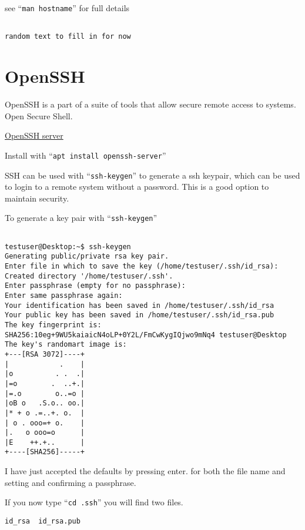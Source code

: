 \documentclass{book}
\begin{document}
see ``\verb|man hostname|'' for full details

\begin{verbatim}

random text to fill in for now

\end{verbatim}



\section{OpenSSH}

OpenSSH is a part of a suite of tools that allow secure remote access to systems. Open Secure Shell.

\href{https://www.openssh.com/}{OpenSSH server}

Install with ``\verb|apt install openssh-server|''

SSH can be used with ``\verb|ssh-keygen|'' to generate a ssh keypair, which can be used to login to a remote system without a password. This is a good option to maintain security.

To generate a key pair with ``\verb|ssh-keygen|''


\begin{verbatim}

testuser@Desktop:~$ ssh-keygen
Generating public/private rsa key pair.
Enter file in which to save the key (/home/testuser/.ssh/id_rsa):
Created directory '/home/testuser/.ssh'.
Enter passphrase (empty for no passphrase):
Enter same passphrase again:
Your identification has been saved in /home/testuser/.ssh/id_rsa
Your public key has been saved in /home/testuser/.ssh/id_rsa.pub
The key fingerprint is:
SHA256:10eg+9WU5kaiaicN4oLP+0Y2L/FmCwKygIQjwo9mNq4 testuser@Desktop
The key's randomart image is:
+---[RSA 3072]----+
|            .    |
|o          . .  .|
|=o        .  ..+.|
|=.o        o..=o |
|oB o   .S.o.. oo.|
|* + o .=..+. o.  |
| o . ooo=+ o.    |
|.   o ooo=o      |
|E    ++.+..      |
+----[SHA256]-----+

\end{verbatim}

I have just accepted the defaults by pressing enter. for both the file name and setting and confirming a passphrase.

If you now type ``\verb|cd .ssh|'' you will find two files.

\begin{verbatim}
id_rsa  id_rsa.pub
\end{verbatim}
\end{document}
